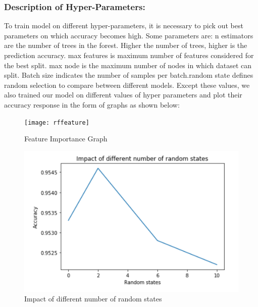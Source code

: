 \subsubsection{Description of Hyper-Parameters:}

To train model on different hyper-parameters, it is necessary to pick out best parameters on which accuracy becomes high. Some parameters are: n estimators are the number of trees in the forest. Higher the number of trees, higher is the prediction accuracy. max features is maximum number of features considered for the best split. max node is the  maximum number of nodes in which dataset can split. Batch size  indicates the number of samples per batch.random state defines random selection to compare between different models.
Except these values, we also trained our model on different values of hyper parameters and plot their accuracy response in the form of graphs as shown below:

\begin{figure}[h]
\begin{center}
\texttt{[image: rffeature]}
\caption{Feature Importance Graph}
\label{fig:4}
\end{center}
\end{figure}

\clearpage

\begin{figure}[h]
  		\centering
    		\includegraphics[scale=0.8]{./Figures/rfrs}
\caption{Impact of different number of random states}
\label{fig:5}
 		\end{figure}

